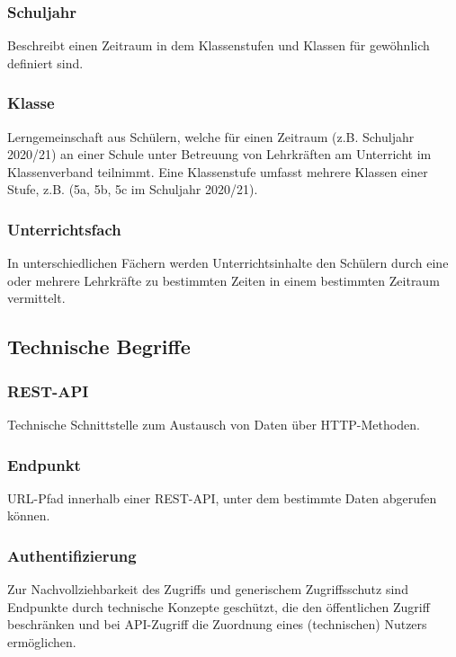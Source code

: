 \subsubsection*{Schuljahr}
Beschreibt einen Zeitraum in dem Klassenstufen und Klassen für gewöhnlich definiert sind.

\subsubsection*{Klasse}
Lerngemeinschaft aus Schülern, welche für einen Zeitraum (z.B. Schuljahr 2020/21) an einer Schule unter Betreuung von Lehrkräften am Unterricht im Klassenverband teilnimmt. Eine Klassenstufe umfasst mehrere Klassen einer Stufe, z.B. (5a, 5b, 5c im Schuljahr 2020/21).

\subsubsection*{Unterrichtsfach}
In unterschiedlichen Fächern werden Unterrichtsinhalte den Schülern durch eine oder mehrere Lehrkräfte zu bestimmten Zeiten in einem bestimmten Zeitraum vermittelt.  

\subsection{Technische Begriffe}

\subsubsection*{REST-API}

Technische Schnittstelle zum Austausch von Daten über HTTP-Methoden.

\subsubsection*{Endpunkt}

URL-Pfad innerhalb einer REST-API, unter dem bestimmte Daten abgerufen können.

\subsubsection*{Authentifizierung}

Zur Nachvollziehbarkeit des Zugriffs und generischem Zugriffsschutz sind Endpunkte durch technische Konzepte geschützt, die den öffentlichen Zugriff beschränken und bei API-Zugriff die Zuordnung eines (technischen) Nutzers ermöglichen.
 
